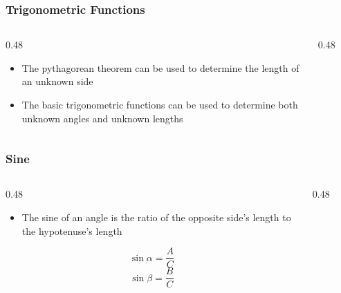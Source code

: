 \begin{frame}
	\frametitle{Trigonometric Functions}

    \begin{columns}
        \begin{column}{0.48\linewidth}
            \begin{itemize}[<+- | alert@+>]
                \item The pythagorean theorem can be used to determine the length of an unknown side
                \item The basic trigonometric functions can be used to determine both unknown angles and unknown lengths
            \end{itemize}
        \end{column}
        \begin{column}{0.48\linewidth}
            \begin{figure}
                \centering
                \resizebox{0.75\linewidth}{!}{
                    
                }
            \end{figure}
        \end{column}
    \end{columns}
\end{frame}

\begin{frame}
	\frametitle{Sine}

    \begin{columns}
        \begin{column}{0.48\linewidth}
            \begin{itemize}[<+- | alert@+>]
                \item The sine of an angle is the ratio of the opposite side's length to the hypotenuse's length
            \end{itemize}
            \[\sin \alpha = \dfrac{A}{C}\]
            \[\sin \beta = \dfrac{B}{C}\]
        \end{column}
        \begin{column}{0.48\linewidth}
            \begin{figure}
                \centering
                \resizebox{0.75\linewidth}{!}{
                    
                }
            \end{figure}
        \end{column}
    \end{columns}
\end{frame}

